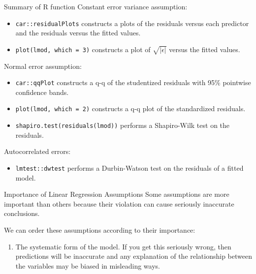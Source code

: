 \begin{frame}[fragile]{Summary of R function}
\protect\hypertarget{summary-of-r-function-1}{}
Constant error variance assumption:

\begin{itemize}
\tightlist
\item
  \texttt{car::residualPlots} constructs a plots of the residuals versus
  each predictor and the residuals versus the fitted values.
\item
  \texttt{plot(lmod,\ which\ =\ 3)} constructs a plot of
  \(\sqrt{|\hat{\epsilon}|}\) versus the fitted values.
\end{itemize}

Normal error assumption:

\begin{itemize}
\tightlist
\item
  \texttt{car::qqPlot} constructs a q-q of the studentized residuals
  with 95\% pointwise confidence bands.
\item
  \texttt{plot(lmod,\ which\ =\ 2)} constructs a q-q plot of the
  standardized residuals.
\item
  \texttt{shapiro.test(residuals(lmod))} performs a Shapiro-Wilk test on
  the residuals.
\end{itemize}

Autocorrelated errors:

\begin{itemize}
\tightlist
\item
  \texttt{lmtest::dwtest} performs a Durbin-Watson test on the residuals
  of a fitted model.
\end{itemize}
\end{frame}

\begin{frame}{Importance of Linear Regression Assumptions}
\protect\hypertarget{importance-of-linear-regression-assumptions}{}
Some assumptions are more important than others because their violation
can cause seriously inaccurate conclusions.

We can order these assumptions according to their importance:

\begin{enumerate}
\tightlist
\item
  The systematic form of the model. If you get this seriously wrong,
  then predictions will be inaccurate and any explanation of the
  relationship between the variables may be biased in misleading ways.
\end{enumerate}
\end{frame}

